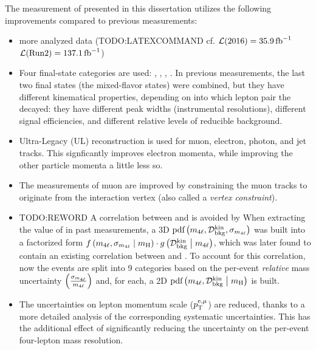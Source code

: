 The measurement of \mH presented in this dissertation utilizes the following improvements compared to previous measurements:
\begin{itemize}
    \item more analyzed data (TODO:LATEXCOMMAND cf. $\mathcal{L}(2016) = 35.9\,\text{fb}^{\text{$-$}1}$ \vs $\mathcal{L}(\text{Run2}) = 137.1\,\text{fb}^{\text{$-$}1}$)
    \item Four final-state categories are used: \fourmu, \foure, \twoetwomu, \twomutwoe.
    In previous measurements, the last two final states (the mixed-flavor states) were combined, but they have different kinematical properties, depending on into which lepton pair the \Zone decayed:
    they have different peak widths (instrumental resolutions), different signal efficiencies, and different relative levels of reducible background.
    \item Ultra-Legacy (UL) reconstruction is used for muon, electron, photon, and jet tracks.
    This signficantly improves electron momenta, while improving the other particle momenta a little less so.
    \item The measurements of muon \pt are improved by constraining the muon tracks to originate from the interaction vertex (also called a \emph{vertex constraint}).
    \item TODO:REWORD A correlation between \mfourlerr and \Dkinbkg is avoided by 
    When extracting the value of \mH in past measurements, a 3D $\text{pdf} \left( m_{4\ell}, \mathcal{D}^{\text{kin}}_{\text{bkg}}, \sigma_{m_{4\ell}} \right)$ was built into a factorized form
    $f \left( m_{4\ell}, \sigma_{m_{4\ell}} \; \middle| \;{} m_{\mathrm{H}} \right)   \cdot   g\left( \mathcal{D}^{\text{kin}}_{\text{bkg}} \; \middle| \;{} m_{4\ell} \right)$,
    which was later found to contain an existing correlation between \Dkinbkg and \mfourlerr.
    To account for this correlation, now the events are split into 9 categories based on the per-event \emph{relative} mass uncertainty $\left( \frac{\sigma_{m_{4\ell}}}{m_{4\ell}} \right)$ and, for each, a 2D $\text{pdf} \left( m_{4\ell}, \mathcal{D}^{\text{kin}}_{\text{bkg}} \; \middle| \;{} m_{\mathrm{H}} \right)$ is built.
    \item The uncertainties on lepton momentum scale ($p_{\mathrm{T}}^{\mathrm{e}, \mu}$) are reduced, thanks to a more detailed analysis of the corresponding systematic uncertainties.
    This has the additional effect of significantly reducing the uncertainty on the per-event four-lepton mass resolution.
\end{itemize}

